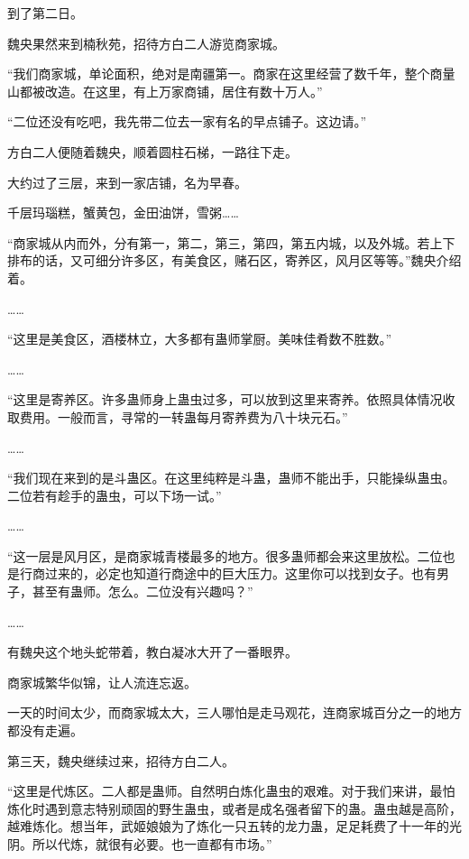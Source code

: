 
\begin{this_body}

到了第二日。

魏央果然来到楠秋苑，招待方白二人游览商家城。

“我们商家城，单论面积，绝对是南疆第一。商家在这里经营了数千年，整个商量山都被改造。在这里，有上万家商铺，居住有数十万人。”

“二位还没有吃吧，我先带二位去一家有名的早点铺子。这边请。”

方白二人便随着魏央，顺着圆柱石梯，一路往下走。

大约过了三层，来到一家店铺，名为早春。

千层玛瑙糕，蟹黄包，金田油饼，雪粥……

“商家城从内而外，分有第一，第二，第三，第四，第五内城，以及外城。若上下排布的话，又可细分许多区，有美食区，赌石区，寄养区，风月区等等。”魏央介绍着。

……

“这里是美食区，酒楼林立，大多都有蛊师掌厨。美味佳肴数不胜数。”

……

“这里是寄养区。许多蛊师身上蛊虫过多，可以放到这里来寄养。依照具体情况收取费用。一般而言，寻常的一转蛊每月寄养费为八十块元石。”

……

“我们现在来到的是斗蛊区。在这里纯粹是斗蛊，蛊师不能出手，只能操纵蛊虫。二位若有趁手的蛊虫，可以下场一试。”

……

“这一层是风月区，是商家城青楼最多的地方。很多蛊师都会来这里放松。二位也是行商过来的，必定也知道行商途中的巨大压力。这里你可以找到女子。也有男子，甚至有蛊师。怎么。二位没有兴趣吗？”

……

有魏央这个地头蛇带着，教白凝冰大开了一番眼界。

商家城繁华似锦，让人流连忘返。

一天的时间太少，而商家城太大，三人哪怕是走马观花，连商家城百分之一的地方都没有走遍。

第三天，魏央继续过来，招待方白二人。

“这里是代炼区。二人都是蛊师。自然明白炼化蛊虫的艰难。对于我们来讲，最怕炼化时遇到意志特别顽固的野生蛊虫，或者是成名强者留下的蛊。蛊虫越是高阶，越难炼化。想当年，武姬娘娘为了炼化一只五转的龙力蛊，足足耗费了十一年的光阴。所以代炼，就很有必要。也一直都有市场。”


\end{this_body}
